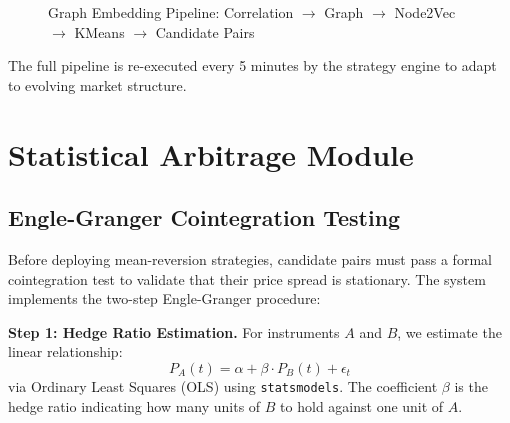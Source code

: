\documentclass[letterpaper,11pt]{report}
\begin{document}
\begin{figure}[h]
\centering
{}
\caption{Graph Embedding Pipeline: Correlation $\to$ Graph $\to$ Node2Vec $\to$ KMeans $\to$ Candidate Pairs}
\end{figure}

The full pipeline is re-executed every 5 minutes by the strategy engine to adapt to evolving market structure.


\chapter{Statistical Arbitrage Module}

\section{Engle-Granger Cointegration Testing}

Before deploying mean-reversion strategies, candidate pairs must pass a formal cointegration test to validate that their price spread is stationary. The system implements the two-step Engle-Granger procedure:

\textbf{Step 1: Hedge Ratio Estimation.} For instruments $A$ and $B$, we estimate the linear relationship:
$$P_A(t) = \alpha + \beta \cdot P_B(t) + \epsilon_t$$
via Ordinary Least Squares (OLS) using \texttt{statsmodels}. The coefficient $\beta$ is the hedge ratio indicating how many units of $B$ to hold against one unit of $A$.
\end{document}

